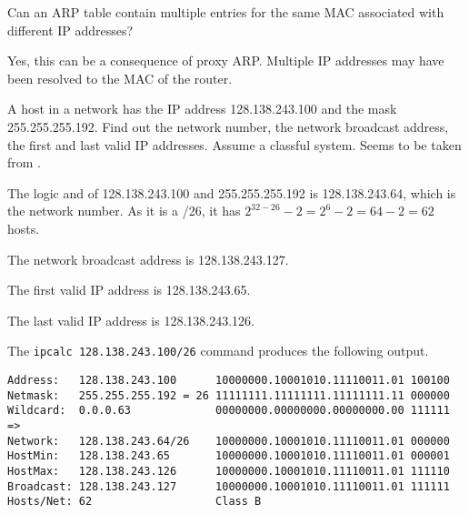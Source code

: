 \begin{Exercise}
Can an ARP table contain multiple entries for the same MAC associated with different IP addresses?
\end{Exercise}
\begin{Answer}
Yes, this can be a consequence of proxy ARP.
Multiple IP addresses may have been resolved to the MAC of the router.
\end{Answer}

\begin{Exercise}
A host in a network has the IP address 128.138.243.100 and the mask 255.255.255.192.
Find out the network number, the network broadcast address, the first and last valid IP addresses.
Assume a classful system. Seems to be taken from \cite{unix-system-administration-handbook-nemeth-2000}.
\end{Exercise}
\begin{Answer}
The logic and of 128.138.243.100 and 255.255.255.192 is 128.138.243.64, which is the network number.
As it is a /26, it has \(2^{32-26} - 2 = 2^{6} - 2 = 64 - 2 = 62\) hosts.

The network broadcast address is 128.138.243.127.

The first valid IP address is 128.138.243.65.

The last valid IP address is 128.138.243.126.

The \texttt{ipcalc 128.138.243.100/26} command produces the following output.

\small\begin{verbatim}
Address:   128.138.243.100      10000000.10001010.11110011.01 100100
Netmask:   255.255.255.192 = 26 11111111.11111111.11111111.11 000000
Wildcard:  0.0.0.63             00000000.00000000.00000000.00 111111
=>
Network:   128.138.243.64/26    10000000.10001010.11110011.01 000000
HostMin:   128.138.243.65       10000000.10001010.11110011.01 000001
HostMax:   128.138.243.126      10000000.10001010.11110011.01 111110
Broadcast: 128.138.243.127      10000000.10001010.11110011.01 111111
Hosts/Net: 62                   Class B
\end{verbatim}
\end{Answer}

